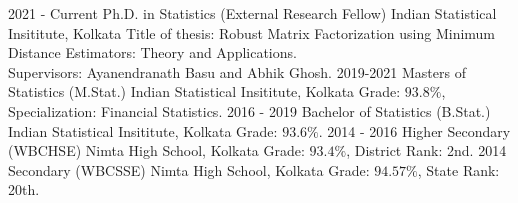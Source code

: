 \documentclass[9pt]{developercv} %
\begin{document}
\vspace{-10 pt}
\begin{entrylist}
    \entry
    {2021 - Current}
    {Ph.D. in Statistics (External Research Fellow)}
    {Indian Statistical Insititute, Kolkata}
    {Title of thesis: Robust Matrix Factorization using Minimum Distance Estimators: Theory and Applications. \\
        Supervisors: Ayanendranath Basu and Abhik Ghosh.}
    \entry
    {2019-2021}
    {Masters of Statistics (M.Stat.)}
    {Indian Statistical Insititute, Kolkata}
    {Grade: $93.8\%$, Specialization: Financial Statistics.}
    \entry
    {2016 - 2019}
    {Bachelor of Statistics (B.Stat.)}
    {Indian Statistical Insititute, Kolkata}
    {Grade: $93.6\%$.}
    \entry
    {2014 - 2016}
    {Higher Secondary (WBCHSE)}
    {Nimta High School, Kolkata}
    {Grade: $93.4\%$, District Rank: 2nd.}
    \entry
    {2014}
    {Secondary (WBCSSE)}
    {Nimta High School, Kolkata}
    {Grade: $94.57\%$, State Rank: 20th.}
\end{entrylist}

\end{document}
